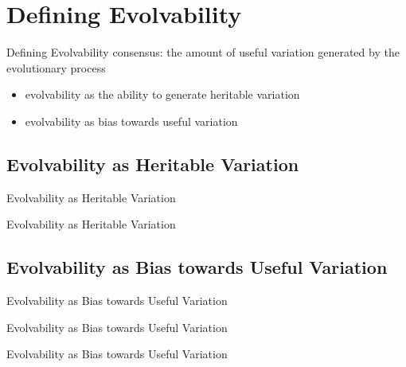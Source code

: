 \section{Defining Evolvability}

\begin{frame}{Defining Evolvability}
consensus: the amount of useful variation generated by the evolutionary process
\begin{itemize}
  \item evolvability as the ability to generate heritable variation
  \item evolvability as bias towards useful variation
\end{itemize}
\end{frame}



\subsection{Evolvability as Heritable Variation}

\begin{frame}{Evolvability as Heritable Variation}
	
\end{frame}

\begin{frame}{Evolvability as Heritable Variation}
  
\end{frame}

\subsection{Evolvability as Bias towards Useful Variation}

\begin{frame}{Evolvability as Bias towards Useful Variation}
  
\end{frame}

\begin{frame}{Evolvability as Bias towards Useful Variation}
  
\end{frame}

\begin{frame}{Evolvability as Bias towards Useful Variation}
  
\end{frame}
